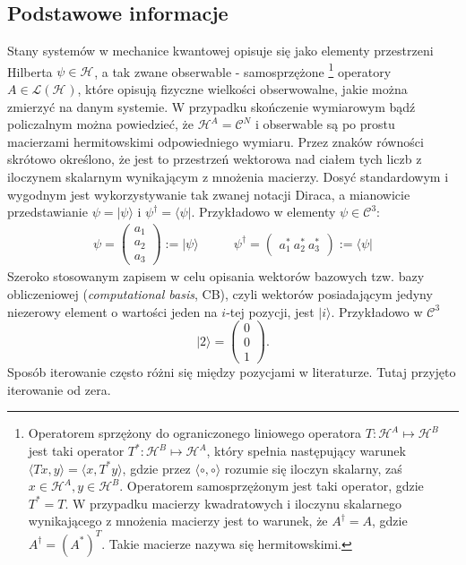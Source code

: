 \documentclass[10pt]{article} %
\newcommand{\Mats}[1]{\mathcal{L}(#1)}
\newcommand{\Hx}[1]{\mathcal{H}^{#1}}
\newcommand{\LHx}[1]{\Mats{\Hx{#1}}}
\newcommand{\Ket}[1]{|#1\rangle}
\newcommand{\Bra}[1]{\langle#1|}
\begin{document}
\subsection{Podstawowe informacje}
Stany systemów w mechanice kwantowej opisuje się jako elementy przestrzeni Hilberta $\psi \in \Hx{}$, a tak zwane obserwable - samosprzężone
\footnote{
Operatorem sprzężony do ograniczonego liniowego operatora $T: \Hx{A} \mapsto \Hx{B}$ jest taki operator $T^*: \Hx{B} \mapsto \Hx{A}$, który spełnia następujący warunek $\langle T x,  y \rangle = \langle x,T^*  y \rangle$, gdzie przez $\langle \circ, \circ \rangle$ rozumie się iloczyn skalarny, zaś $x \in \Hx{A}, y \in \Hx{B}$. Operatorem samosprzężonym jest taki operator, gdzie $T^* = T$. W przypadku macierzy kwadratowych i iloczynu skalarnego wynikającego z mnożenia macierzy jest to warunek, że $A^\dag = A$, gdzie $A^\dag = (A^*)^T$. Takie macierze nazywa się hermitowskimi.
} operatory $A \in \LHx{}$, które opisują fizyczne wielkości obserwowalne, jakie można zmierzyć na danym systemie. W przypadku skończenie wymiarowym bądź policzalnym można powiedzieć, że $\Hx{A} = \mathcal{C}^N$ i
obserwable są po prostu macierzami hermitowskimi odpowiedniego wymiaru. Przez znaków równości skrótowo określono, że jest to przestrzeń wektorowa nad ciałem tych liczb z iloczynem skalarnym wynikającym z mnożenia macierzy. Dosyć standardowym i wygodnym jest wykorzystywanie tak zwanej notacji Diraca, a mianowicie przedstawianie $\psi = \Ket{\psi}$ i $\psi^\dag = \Bra{\psi}$.
Przykładowo w elementy $\psi \in \mathcal{C}^3$:
\begin{align}
\psi = 
\begin{pmatrix}
a_1\\a_2\\a_3
\end{pmatrix}
:= \Ket{\psi}
\quad & \quad\psi^\dag = 
\begin{pmatrix}
a_1^*~a_2^*~a_3^*
\end{pmatrix}
:= \Bra{\psi}
\end{align}
Szeroko stosowanym zapisem w celu opisania wektorów bazowych tzw. bazy obliczeniowej (\textit{computational basis}, CB), czyli wektorów posiadającym jedyny niezerowy element o wartości jeden na $i$-tej pozycji, jest $\Ket{i}$.
Przykładowo w $\mathcal{C}^3$
\begin{equation}
\Ket{2} = \begin{pmatrix} 0\\0\\1 \end{pmatrix}.
\end{equation} Sposób iterowanie często różni się między pozycjami w literaturze. Tutaj przyjęto iterowanie od zera.
\end{document}
